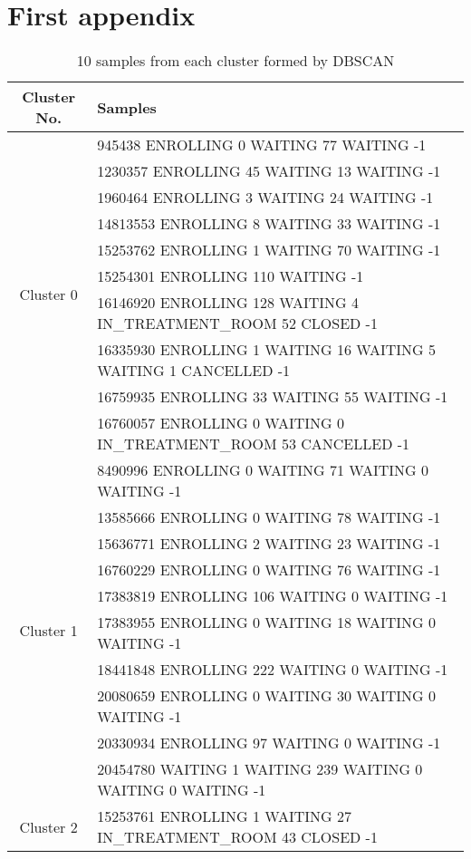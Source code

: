 \chapter{First appendix}
\label{chapter:Visit Samples}

{\scriptsize
\begin{longtable}{|c|p{}|}
\caption{10 samples from each cluster formed by DBSCAN}
\label{tab:samplesFromCluster}\\
		\hline
		Cluster No. & Samples \\
		\hline
		\multirow{10}{*}{Cluster 0}
		& 945438 ENROLLING 0 WAITING 77 WAITING -1 \\
		& 1230357 ENROLLING 45 WAITING 13 WAITING -1 \\
		& 1960464 ENROLLING 3 WAITING 24 WAITING -1 \\
		& 14813553 ENROLLING 8 WAITING 33 WAITING -1 \\
		& 15253762 ENROLLING 1 WAITING 70 WAITING -1 \\
		& 15254301 ENROLLING 110 WAITING -1 \\
		& 16146920 ENROLLING 128 WAITING 4 IN\_TREATMENT\_ROOM 52 CLOSED -1 \\
		& 16335930 ENROLLING 1 WAITING 16 WAITING 5 WAITING 1 CANCELLED -1 \\
		& 16759935 ENROLLING 33 WAITING 55 WAITING -1 \\
		& 16760057 ENROLLING 0 WAITING 0 IN\_TREATMENT\_ROOM 53 CANCELLED -1 \\
		\hline
		\multirow{10}{*}{Cluster 1}
		& 8490996 ENROLLING 0 WAITING 71 WAITING 0 WAITING -1 \\
		& 13585666 ENROLLING 0 WAITING 78 WAITING -1 \\
		& 15636771 ENROLLING 2 WAITING 23 WAITING -1 \\
		& 16760229 ENROLLING 0 WAITING 76 WAITING -1 \\
		& 17383819 ENROLLING 106 WAITING 0 WAITING -1 \\
		& 17383955 ENROLLING 0 WAITING 18 WAITING 0 WAITING -1 \\
		& 18441848 ENROLLING 222 WAITING 0 WAITING -1 \\
		& 20080659 ENROLLING 0 WAITING 30 WAITING 0 WAITING -1 \\
		& 20330934 ENROLLING 97 WAITING 0 WAITING -1 \\
		& 20454780 WAITING 1 WAITING 239 WAITING 0 WAITING 0 WAITING -1 \\
		\hline
		\multirow{10}{*}{Cluster 2}
		& 15253761 ENROLLING 1 WAITING 27 IN\_TREATMENT\_ROOM 43 CLOSED -1 \\

\end{longtable}}
